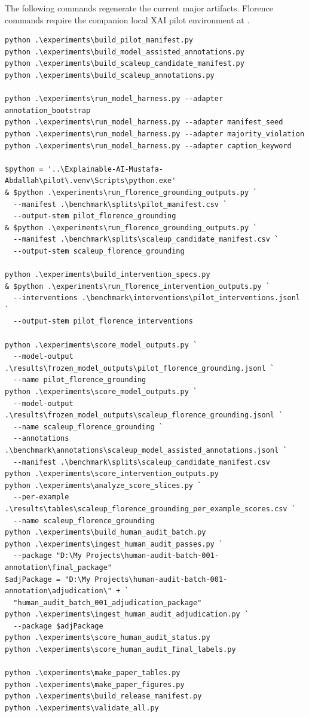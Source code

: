 The following commands regenerate the current major artifacts. Florence commands require the companion local XAI pilot environment at .

{\scriptsize
\begin{verbatim}
python .\experiments\build_pilot_manifest.py
python .\experiments\build_model_assisted_annotations.py
python .\experiments\build_scaleup_candidate_manifest.py
python .\experiments\build_scaleup_annotations.py

python .\experiments\run_model_harness.py --adapter annotation_bootstrap
python .\experiments\run_model_harness.py --adapter manifest_seed
python .\experiments\run_model_harness.py --adapter majority_violation
python .\experiments\run_model_harness.py --adapter caption_keyword

$python = '..\Explainable-AI-Mustafa-Abdallah\pilot\.venv\Scripts\python.exe'
& $python .\experiments\run_florence_grounding_outputs.py `
  --manifest .\benchmark\splits\pilot_manifest.csv `
  --output-stem pilot_florence_grounding
& $python .\experiments\run_florence_grounding_outputs.py `
  --manifest .\benchmark\splits\scaleup_candidate_manifest.csv `
  --output-stem scaleup_florence_grounding

python .\experiments\build_intervention_specs.py
& $python .\experiments\run_florence_intervention_outputs.py `
  --interventions .\benchmark\interventions\pilot_interventions.jsonl `
  --output-stem pilot_florence_interventions

python .\experiments\score_model_outputs.py `
  --model-output .\results\frozen_model_outputs\pilot_florence_grounding.jsonl `
  --name pilot_florence_grounding
python .\experiments\score_model_outputs.py `
  --model-output .\results\frozen_model_outputs\scaleup_florence_grounding.jsonl `
  --name scaleup_florence_grounding `
  --annotations .\benchmark\annotations\scaleup_model_assisted_annotations.jsonl `
  --manifest .\benchmark\splits\scaleup_candidate_manifest.csv
python .\experiments\score_intervention_outputs.py
python .\experiments\analyze_score_slices.py `
  --per-example .\results\tables\scaleup_florence_grounding_per_example_scores.csv `
  --name scaleup_florence_grounding
python .\experiments\build_human_audit_batch.py
python .\experiments\ingest_human_audit_passes.py `
  --package "D:\My Projects\human-audit-batch-001-annotation\final_package"
$adjPackage = "D:\My Projects\human-audit-batch-001-annotation\adjudication\" + `
  "human_audit_batch_001_adjudication_package"
python .\experiments\ingest_human_audit_adjudication.py `
  --package $adjPackage
python .\experiments\score_human_audit_status.py
python .\experiments\score_human_audit_final_labels.py

python .\experiments\make_paper_tables.py
python .\experiments\make_paper_figures.py
python .\experiments\build_release_manifest.py
python .\experiments\validate_all.py
\end{verbatim}
}

